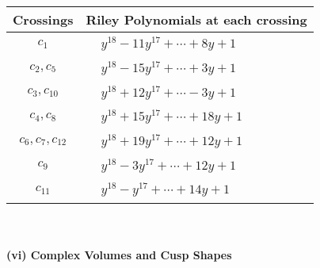 \documentclass[1p]{elsarticle_modified}
\theoremstyle{definition}
\begin{document}
\begin{tabular}{m{50pt}|m{274pt}}
Crossings & \hspace{64pt}Riley Polynomials at each crossing \\
\hline $$\begin{aligned}c_{1}\end{aligned}$$&$\begin{aligned}
&y^{18}-11 y^{17}+\cdots+8 y+1
\end{aligned}$\\
\hline $$\begin{aligned}c_{2},c_{5}\end{aligned}$$&$\begin{aligned}
&y^{18}-15 y^{17}+\cdots+3 y+1
\end{aligned}$\\
\hline $$\begin{aligned}c_{3},c_{10}\end{aligned}$$&$\begin{aligned}
&y^{18}+12 y^{17}+\cdots-3 y+1
\end{aligned}$\\
\hline $$\begin{aligned}c_{4},c_{8}\end{aligned}$$&$\begin{aligned}
&y^{18}+15 y^{17}+\cdots+18 y+1
\end{aligned}$\\
\hline $$\begin{aligned}c_{6},c_{7},c_{12}\end{aligned}$$&$\begin{aligned}
&y^{18}+19 y^{17}+\cdots+12 y+1
\end{aligned}$\\
\hline $$\begin{aligned}c_{9}\end{aligned}$$&$\begin{aligned}
&y^{18}-3 y^{17}+\cdots+12 y+1
\end{aligned}$\\
\hline $$\begin{aligned}c_{11}\end{aligned}$$&$\begin{aligned}
&y^{18}- y^{17}+\cdots+14 y+1
\end{aligned}$\\
\hline
\end{tabular}\\~\\
\newpage\flushleft \textbf{(vi) Complex Volumes and Cusp Shapes}
\end{document}
